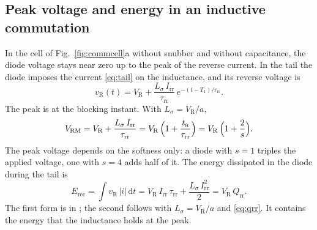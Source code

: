 \documentclass[10pt,a4paper]{scrartcl}
\newcommand{\VR}{V_\mathrm{R}}
\newcommand{\Irr}{I_\mathrm{rr}}
\newcommand{\Qrr}{Q_\mathrm{rr}}
\newcommand{\ta}{t_\mathrm{a}}
\newcommand{\taurr}{\tau_\mathrm{rr}}
\newcommand{\Tone}{T_1}
\newcommand{\Vrm}{V_\mathrm{RM}}
\newcommand{\diff}{\mathrm{d}}
\newcommand{\Ls}{L_\sigma}                    %
\newcommand{\Erec}{E_\mathrm{rec}}
\begin{document}
\subsection{Peak voltage and energy in an inductive commutation}
\label{sec:energy}
In the cell of Fig.~\ref{fig:commcell}a without snubber and without capacitance, the diode voltage stays near zero up to the peak of the reverse current. In the tail the diode imposes the current \eqref{eq:tail} on the inductance, and its reverse voltage is
\begin{equation}
v_\mathrm{R}(t) = \VR + \frac{\Ls\,\Irr}{\taurr}\,e^{-(t-\Tone)/\taurr} .
\end{equation}
The peak is at the blocking instant. With $\Ls = \VR/a$,
\begin{equation}
\Vrm = \VR + \frac{\Ls\,\Irr}{\taurr} = \VR\,\Bigl(1 + \frac{\ta}{\taurr}\Bigr) = \VR\,\Bigl(1 + \frac{2}{s}\Bigr) .
\label{eq:vrm}
\end{equation}
The peak voltage depends on the softness only: a diode with $s = 1$ triples the applied voltage, one with $s = 4$ adds half of it. The energy dissipated in the diode during the tail is
\begin{equation}
\Erec = \int v_\mathrm{R}\,|i|\,\diff t = \VR\,\Irr\,\taurr + \frac{\Ls\,\Irr^2}{2} = \VR\,\Qrr .
\label{eq:erec}
\end{equation}
The first form is in \cite{mathworks}; the second follows with $\Ls = \VR/a$ and \eqref{eq:qrr}. It contains the energy that the inductance holds at the peak.
\end{document}
